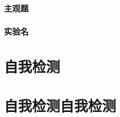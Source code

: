 \documentclass[color=BLUE]{textbook-cn}%
\begin{document}
\lipsum[1-6]
\begin{Improve}
\begin{QsNum}
\item \lipsum[1][1-4]
\item \lipsum[1][1-4]
\item \lipsum[1][1-4]
\item \lipsum[1][1-4]
\item \lipsum[1][1-4]
\item \lipsum[1][1-4]
\item \lipsum[1][1-4]
\item \lipsum[1][1-4]
\end{QsNum}
\begin{QsNum}
\item \lipsum[1][1-4]
\item \lipsum[1][1-4]
\item \lipsum[1][1-4]
\item \lipsum[1][1-4]
\item \lipsum[1][1-4]
\item \lipsum[1][1-4]
\item \lipsum[1][1-4]
\item \lipsum[1][1-4]
\end{QsNum}
\tcblower
\lipsum[1]
\end{Improve}





\begin{Quiz}
\section{主观题}
\end{Quiz}



\begin{Project}
\section{实验名}

\begin{Theorem*}[定理名称]
\lipsum[1][1-3]
\end{Theorem*}
\end{Project}


\part*{自我检测}
\part*{自我检测自我检测}
\end{document}
